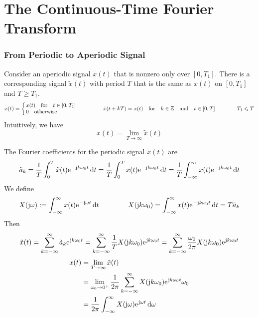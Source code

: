 \documentclass[10pt,UTF8]{article}
\makeatletter
\newenvironment{definition box}
{\begin{tcolorbox}[colback=blue!5!white,colframe=blue!75!black,parbox=false,before upper=\par,before lower=\par]}
{\end{tcolorbox}}
\newenvironment{theorem box}
{\begin{tcolorbox}[colback=yellow!5!white,colframe=yellow!75!black,parbox=false,before upper=\par,before lower=\par]}
{\end{tcolorbox}}
\theoremstyle{definition}
\newtheorem{definition inner}{Definition}[section]
\theoremstyle{plain}
\newtheorem{theorem inner}{Theorem}[section]
\theoremstyle{definition}
\newtheorem*{proof inner}{\textit{Proof}}
\theoremstyle{remark}
\newcommand{\mycases}[2][0.8]{
    \left\{\vphantom{\scalebox{#1}{
        $\begin{matrix}#2\end{matrix}$
    }}\right.\!\!\!\!
    \begin{array}{l@{\quad}l}#2\end{array}
}
\newcommand{\ju}{\mathrm{j}}  %
\newcommand{\e}{\mathrm{e}{\mkern 1 mu}}
\makeatother
\begin{document}
\part*{The Continuous-Time Fourier Transform}

\section{From Periodic to Aperiodic Signal}

Consider an aperiodic signal $x(t)$
that is nonzero only over $[0,T_1]$.
There is a corresponding signal $\tilde{x}(t)$ with period $T$
that is the same as $x(t)$ on $[0,T_1]$ and $T\geqslant T_1$.
\begin{equation*}
    x(t) = \mycases{
        x(t) \qfor t\in[0,T_1] \\
        0 \qotherwise
    }
    \qquad\qquad
    \tilde{x}(t+k T) = x(t)
    \qfor k\in\mathbb{Z}\qand t\in[0,T]
    \qquad\qquad
    T_1 \leqslant T
\end{equation*}
Intuitively, we have
\begin{equation*}
    x(t) = \lim_{T\to\infty} \tilde{x}(t)
\end{equation*}

The Fourier coefficients for the periodic signal $\tilde{x}(t)$ are
\begin{equation*}
\tilde{a}_k = 
\frac{1}{T}\int_{0}^{T}\tilde{x}(t)\e^{-\ju k\omega_0 t}\dd{t}
=\frac{1}{T}\int_{0}^{T}x(t)\e^{-\ju k\omega_0 t}\dd{t}
=\frac{1}{T}\int_{-\infty}^{\infty}x(t)\e^{-\ju k\omega_0 t}\dd{t}
\end{equation*}
We define
\begin{equation*}
    X(\ju\omega) :=
    \int_{-\infty}^{\infty}x(t)\e^{-\ju\omega t}\dd{t}
    \qquad\qquad
    X(\ju k\omega_0) =
    \int_{-\infty}^{\infty}x(t)\e^{-\ju k\omega_0 t}\dd{t}
    = T\tilde{a}_k
\end{equation*}
Then
\begin{equation*}
    \tilde{x}(t) = 
    \sum_{k=-\infty}^{\infty}
    \tilde{a}_k \e^{\ju k\omega_0 t}
    = \sum_{k=-\infty}^{\infty}
    \frac{1}{T}X(\ju k\omega_0)\e^{\ju k\omega_0 t}
    = \sum_{k=-\infty}^{\infty}\frac{\omega_0}{2\pi}
    X(\ju k\omega_0)\e^{\ju k\omega_0 t}
\end{equation*}
\begin{align*}
    x(t) &= \lim_{T\to\infty} \tilde{x}(t) \\
    &= \lim_{\omega_0\to 0^+} \frac{1}{2\pi}\sum_{k=-\infty}^{\infty}
    X(\ju k\omega_0)\e^{\ju k\omega_0 t}\omega_0 \\
    &= \frac{1}{2\pi}\int_{-\infty}^{\infty}
    X(\ju\omega)\e^{\ju\omega t}\dd{\omega}
\end{align*}
\end{document}
